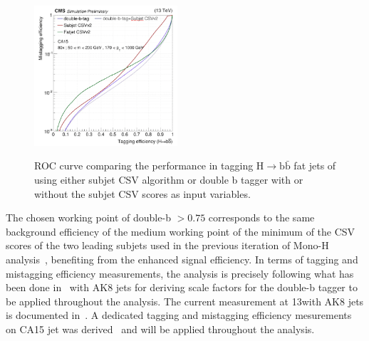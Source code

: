 \begin{figure}
  \centering
  \includegraphics[width=0.475\textwidth]{figures/higgstagging/doubleb/doubleb_roc_split.png}\\
  \caption{ROC curve comparing the performance in tagging $\text{H}\to\text{b}\bar{\text{b}}$ fat jets of using either subjet CSV algorithm or double b tagger with or without the subjet CSV scores as input variables.}
  \label{fig:doublebroc}
\end{figure}

The chosen working point of double-b $> 0.75$ corresponds to the same background efficiency of the medium working point of the minimum of the CSV scores of the two leading subjets used in the previous iteration of Mono-H  analysis~\cite{monoH}, benefiting from the enhanced signal efficiency.
In terms of tagging and mistagging efficiency measurements, the analysis is precisely following what has been done in~\cite{CMS-PAS-BTV-15-002} with AK8 jets for deriving scale factors for the double-b tagger to be applied throughout the analysis. The current measurement at 13\TeV with AK8 jets is documented in~\cite{Ref:BTAG2016}. A dedicated tagging and mistagging efficiency mesurements on CA15 jet was derived~\cite{monoH} and will be applied throughout the analysis.


